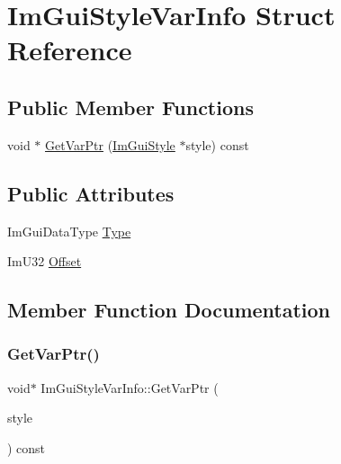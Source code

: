 \hypertarget{struct_im_gui_style_var_info}{}\section{Im\+Gui\+Style\+Var\+Info Struct Reference}
\label{struct_im_gui_style_var_info}
\subsection*{Public Member Functions}
\begin{DoxyCompactItemize}
\item 
void $\ast$ \hyperlink{struct_im_gui_style_var_info_a92aebc5f0d8b2b43b61dbcaf992b5643}{Get\+Var\+Ptr} (\hyperlink{struct_im_gui_style}{Im\+Gui\+Style} $\ast$style) const
\end{DoxyCompactItemize}
\subsection*{Public Attributes}
\begin{DoxyCompactItemize}
\item 
Im\+Gui\+Data\+Type \hyperlink{struct_im_gui_style_var_info_a62f42d2bb7b71b7530493e16e622cb81}{Type}
\item 
Im\+U32 \hyperlink{struct_im_gui_style_var_info_ae900d6a02166d3d0433c18b95aec10e8}{Offset}
\end{DoxyCompactItemize}


\subsection{Member Function Documentation}
\hypertarget{struct_im_gui_style_var_info_a92aebc5f0d8b2b43b61dbcaf992b5643}{}\label{struct_im_gui_style_var_info_a92aebc5f0d8b2b43b61dbcaf992b5643} 
\subsubsection{\texorpdfstring{Get\+Var\+Ptr()}{GetVarPtr()}}
{\footnotesize\ttfamily void$\ast$ Im\+Gui\+Style\+Var\+Info\+::\+Get\+Var\+Ptr (\begin{DoxyParamCaption}\item[{\hyperlink{struct_im_gui_style}{Im\+Gui\+Style} $\ast$}]{style }\end{DoxyParamCaption}) const}



